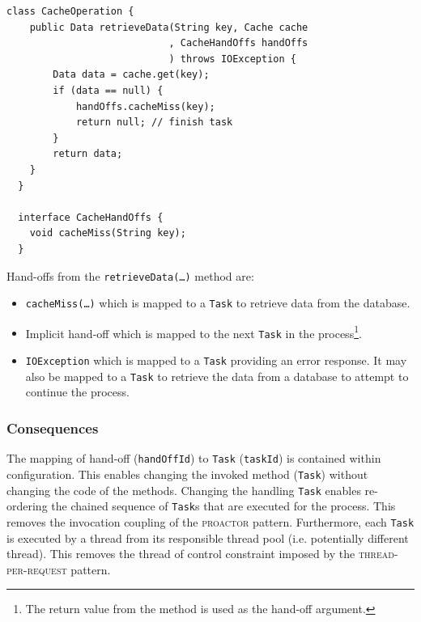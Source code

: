 \documentclass[prodmode]{style/acmlarge}
\begin{document}
\begin{lstlisting}[float,label=lst:Example_Method_Task]
  class CacheOperation {
    public Data retrieveData(String key, Cache cache
                            , CacheHandOffs handOffs
                            ) throws IOException {
        Data data = cache.get(key);
        if (data == null) {
            handOffs.cacheMiss(key);
            return null; // finish task
        }
        return data;
    }
  }

  interface CacheHandOffs {
    void cacheMiss(String key);
  }
\end{lstlisting}

Hand-offs from the \texttt{retrieveData(\ldots)} method are:
\begin{itemize}
  \item \texttt{cacheMiss(\ldots)} which is mapped to a \texttt{Task} to retrieve data from the database.
  \item Implicit hand-off which is mapped to the next \texttt{Task} in the process\footnote{The return value from the method is used as the hand-off argument.}.
  \item \texttt{IOException} which is mapped to a \texttt{Task} providing an error response.  It may also be mapped to a \texttt{Task} to retrieve the data from a database to attempt to continue the process.
\end{itemize}


\subsubsection*{Consequences}

The mapping of hand-off (\texttt{handOffId}) to \texttt{Task} (\texttt{taskId})
is contained within configuration.  This enables changing the invoked method
(\texttt{Task}) without changing the code of the methods.  Changing the handling
\texttt{Task} enables re-ordering the chained sequence of \texttt{Task}s that
are executed for the process.  This removes the invocation coupling of the
\textsc{proactor} pattern.  Furthermore, each \texttt{Task} is executed by a
thread from its responsible thread pool (i.e. potentially different thread). 
This removes the thread of control constraint imposed by the
\textsc{thread-per-request} pattern.
\end{document}
